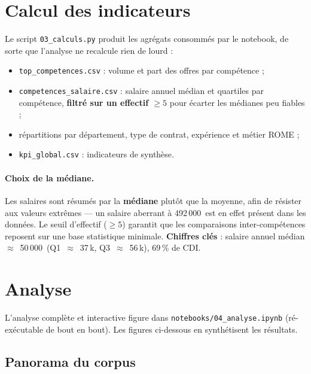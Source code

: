 \documentclass[11pt,a4paper]{article}
\begin{document}
\section{Calcul des indicateurs}
\label{sec:calculs}

Le script \texttt{03\_calculs.py} produit les agrégats consommés par le notebook,
de sorte que l'analyse ne recalcule rien de lourd :
\begin{itemize}
  \item \texttt{top\_competences.csv} : volume et part des offres par compétence ;
  \item \texttt{competences\_salaire.csv} : salaire annuel médian et quartiles par
  compétence, \textbf{filtré sur un effectif $\ge 5$} pour écarter les médianes
  peu fiables ;
  \item répartitions par département, type de contrat, expérience et métier ROME ;
  \item \texttt{kpi\_global.csv} : indicateurs de synthèse.
\end{itemize}

\paragraph{Choix de la médiane.} Les salaires sont résumés par la \textbf{médiane}
plutôt que la moyenne, afin de résister aux valeurs extrêmes — un salaire aberrant
à 492\,000\,\texteuro{} est en effet présent dans les données. Le seuil d'effectif
($\ge 5$) garantit que les comparaisons inter-compétences reposent sur une base
statistique minimale. \textbf{Chiffres clés} : salaire annuel médian
$\approx$~50\,000\,\texteuro{} (Q1~$\approx$~37\,k\texteuro, Q3~$\approx$~56\,k\texteuro),
69\,\% de CDI.

\section{Analyse}
\label{sec:analyse}

L'analyse complète et interactive figure dans \texttt{notebooks/04\_analyse.ipynb}
(ré-exécutable de bout en bout). Les figures ci-dessous en synthétisent les
résultats.

\subsection{Panorama du corpus}
\end{document}
